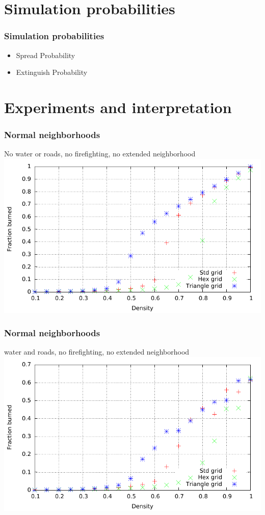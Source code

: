 \documentclass{beamer}
\begin{document}
\section{Simulation probabilities} 

\begin{frame}
\frametitle{Simulation probabilities}
\begin{itemize}
\item{Spread Probability}
\item{Extinguish Probability}
\end{itemize}
\end{frame}

\section{Experiments and interpretation} 

\begin{frame}
\frametitle{Normal neighborhoods}
No water or roads, no firefighting, no extended neighborhood
\centering
\includegraphics[width=\textwidth]{imgs/plot/ex1/fracburned.pdf}
\end{frame}

\begin{frame}
\frametitle{Normal neighborhoods}
water and roads, no firefighting, no extended neighborhood
\centering
\includegraphics[width=\textwidth]{imgs/plot/ex3/fracburned.pdf}
\end{frame}
\end{document}
